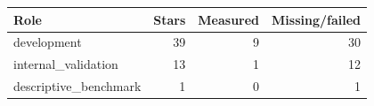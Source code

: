 \begin{tabular}{lrrr}
Role & Stars & Measured & Missing/failed \\
\hline
development & 39 & 9 & 30 \\
internal\_validation & 13 & 1 & 12 \\
descriptive\_benchmark & 1 & 0 & 1 \\
\end{tabular}
